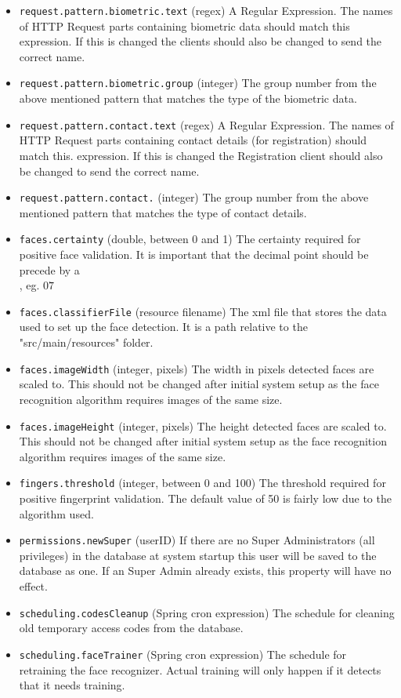 \begin{itemize}
\item \verb!request.pattern.biometric.text! (regex) A Regular Expression. The names of HTTP Request parts containing biometric data should match this expression. If this is changed the clients should also be changed to send the correct name.
\item \verb!request.pattern.biometric.group! (integer) The group number from the above mentioned pattern that matches the type of the biometric data.
\item \verb!request.pattern.contact.text! (regex) A Regular Expression. The names of HTTP Request parts containing contact details (for registration) should match this. expression. If this is changed the Registration client should also be changed to send the correct name.
\item \verb!request.pattern.contact.! (integer) The group number from the above mentioned pattern that matches the type of contact details.

\item \verb!faces.certainty! (double, between 0 and 1) The certainty required for positive face validation. It is important that the decimal point should be precede by a \\, eg. 0\.7 
\item \verb!faces.classifierFile! (resource filename) The xml file that stores the data used to set up the face detection. It is a path relative to the "src/main/resources" folder. 
\item \verb!faces.imageWidth! (integer, pixels) The width in pixels detected faces are scaled to. This should not be changed after initial system setup as the face recognition algorithm requires images of the same size.
\item \verb!faces.imageHeight! (integer, pixels) The height detected faces are scaled to. This should not be changed after initial system setup as the face recognition algorithm requires images of the same size.

\item \verb!fingers.threshold! (integer, between 0 and 100) The threshold required for positive fingerprint validation. The default value of 50 is fairly low due to the algorithm used.
\item \verb!permissions.newSuper! (userID) If there are no Super Administrators (all privileges) in the database at system startup this user will be saved to the database as one. If an Super Admin already exists, this property will have no effect. 

\item \verb!scheduling.codesCleanup! (Spring cron expression) The schedule for cleaning old temporary access codes from the database.
\item \verb!scheduling.faceTrainer! (Spring cron expression) The schedule for retraining the face recognizer. Actual training will only happen if it detects that it needs training. 

\end{itemize}
